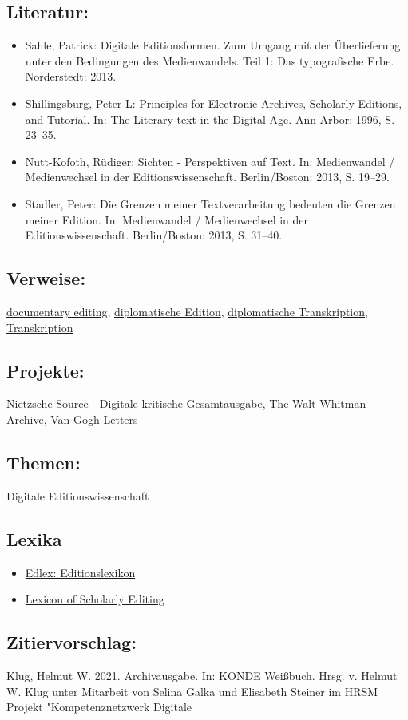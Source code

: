 \documentclass{article}
\begin{document}
        \subsection*{Literatur:}\begin{itemize}\item Sahle, Patrick: Digitale Editionsformen. Zum Umgang mit der Überlieferung unter den Bedingungen des Medienwandels. Teil 1: Das typografische Erbe. Norderstedt: 2013.\item Shillingsburg, Peter L: Principles for Electronic Archives, Scholarly Editions, and Tutorial. In: The Literary text in the Digital Age. Ann Arbor: 1996, S. 23–35.\item Nutt-Kofoth, Rüdiger: Sichten - Perspektiven auf Text. In: Medienwandel / Medienwechsel in der Editionswissenschaft. Berlin/Boston: 2013, S. 19–29.\item Stadler, Peter: Die Grenzen meiner Textverarbeitung bedeuten die Grenzen meiner Edition. In: Medienwandel / Medienwechsel in der Editionswissenschaft. Berlin/Boston: 2013, S. 31–40.\end{itemize}\subsection*{Verweise:}\href{https://gams.uni-graz.at/o:konde.72}{documentary editing}, \href{https://gams.uni-graz.at/o:konde.65}{diplomatische Edition}, \href{https://gams.uni-graz.at/o:konde.66}{diplomatische Transkription}, \href{https://gams.uni-graz.at/o:konde.197}{Transkription}\subsection*{Projekte:}\href{http://www.nietzschesource.org/#eKGWB}{Nietzsche Source - Digitale kritische Gesamtausgabe}, \href{https://whitmanarchive.org}{The Walt Whitman Archive}, \href{http://vangoghletters.org/vg/}{Van Gogh Letters}\subsection*{Themen:}Digitale Editionswissenschaft\subsection*{Lexika}\begin{itemize}\item \href{https://edlex.de/index.php?title=Archivausgabe}{Edlex: Editionslexikon}\item \href{https://lexiconse.uantwerpen.be/index.php/lexicon/archival-collection-edition-2/}{Lexicon of Scholarly Editing}\end{itemize}\subsection*{Zitiervorschlag:}Klug, Helmut W. 2021. Archivausgabe. In: KONDE Weißbuch. Hrsg. v. Helmut W. Klug unter Mitarbeit von Selina Galka und Elisabeth Steiner im HRSM Projekt "Kompetenznetzwerk Digitale 
\end{document}
